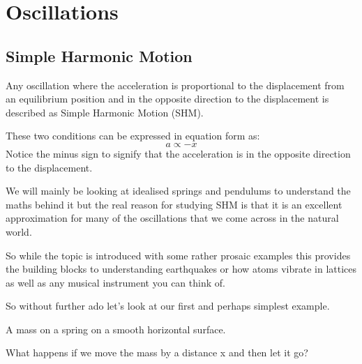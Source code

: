 \documentclass[main.tex]{subfiles}
\begin{document}
\chapter{Oscillations}
\section{Simple Harmonic Motion}


Any oscillation where the acceleration is proportional to the displacement from an equilibrium position and in the opposite direction to the displacement is described as Simple Harmonic Motion (SHM).

These two conditions can be expressed in equation form as:
\[ a \propto -x \]
Notice the minus sign to signify that the acceleration is in the opposite direction to the displacement.

We will mainly be looking at idealised springs and pendulums to understand the maths behind it but the real reason for studying SHM is that it is an excellent approximation for many of the oscillations that we come across in the natural world.

So while the topic is introduced with some rather prosaic examples this provides the building blocks to understanding earthquakes or how atoms vibrate in lattices as well as any musical instrument you can think of.


So without further ado let's look at our first and perhaps simplest example.

A mass on a spring on a smooth horizontal surface.
\vspace{0.2in}



What happens if we move the mass by a distance x and then let it go?
\end{document}
